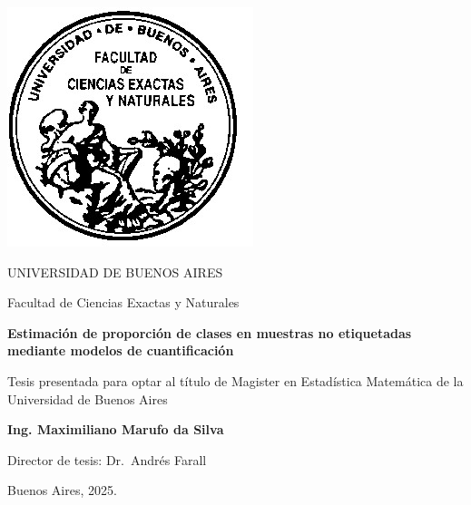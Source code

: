 \thispagestyle{empty}

\begin{center}
  \includegraphics[scale = 0.3]{logofac.jpg}
  
  \medskip
  UNIVERSIDAD DE BUENOS AIRES
  
  Facultad de Ciencias Exactas y Naturales
  
 
  
  \vspace{3cm}
  \textbf{\large Estimación de proporción de clases en muestras no etiquetadas \\ 
  mediante modelos de cuantificación}
  
  \vspace{2cm}
  Tesis presentada para optar al título de Magister en Estadística Matemática de
  la Universidad de Buenos Aires
  
  \vspace{2cm}
  \textbf{Ing. Maximiliano Marufo da Silva}
\end{center}


\vspace{1.5cm}
\noindent Director de tesis: Dr.~Andrés Farall
 

\vspace{1cm}
\noindent Buenos Aires, 2025.
